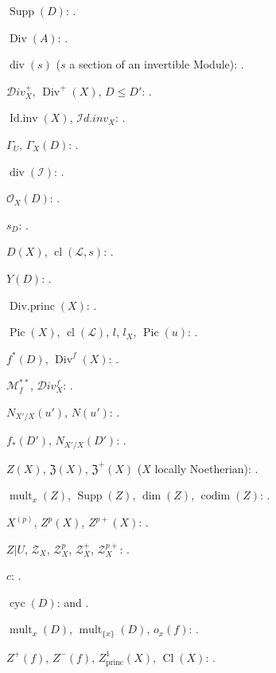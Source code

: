 $\operatorname{Supp}(D)$: .

$\operatorname{Div}(A)$: .

$\operatorname{div}(s)$ ($s$ a section of an invertible Module):
.

$\mathcal{D}iv_X^+$, $\operatorname{Div}^+(X)$, $D\leq D'$:
.

$\operatorname{Id.inv}(X)$, $\mathcal{I}d.inv_X$:
.

$\Gamma_U$, $\Gamma_X(D)$: .

$\operatorname{div}(\mathcal I)$: .

$\mathcal O_X(D)$: .

$s_D$: .

$D(X)$, $\operatorname{cl}(\mathcal L,s)$: .

$Y(D)$: .

$\operatorname{Div.princ}(X)$: .

$\operatorname{Pic}(X)$, $\operatorname{cl}(\mathcal L)$, $l$, $l_X$,
$\operatorname{Pic}(u)$: .

$f^*(D)$, $\operatorname{Div}^f(X)$: .

$\mathcal M_f^{**}$, $\mathcal{D}iv_X^f$: .

$N_{X'/X}(u')$, $N(u')$: .

$f_*(D')$, $N_{X'/X}(D')$: .

$Z(X)$, $\mathfrak Z(X)$, $\mathfrak Z^+(X)$
($X$ locally Noetherian): .

$\operatorname{mult}_x(Z)$, $\operatorname{Supp}(Z)$,
$\dim(Z)$, $\operatorname{codim}(Z)$: .

$X^{(p)}$, $Z^p(X)$, $Z^{p+}(X)$: .

$Z|U$, $\mathcal Z_X$, $\mathcal Z_X^p$, $\mathcal Z_X^+$,
$\mathcal Z_X^{p+}$: .

$c$: .

$\operatorname{cyc}(D)$:  and
.

$\operatorname{mult}_x(D)$, $\operatorname{mult}_{\{x\}}(D)$,
$o_x(f)$: .

$Z^+(f)$, $Z^-(f)$, $Z^1_{\mathrm{princ}}(X)$,
$\operatorname{Cl}(X)$: .

